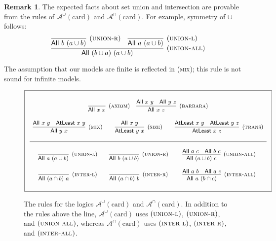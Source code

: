 \documentclass[letterpaper]{article}
\theoremstyle{definition}
\newtheorem{remark}[theorem]{Remark}
\newcommand{\proves}{\vdash}
\newcommand{\Aunion}{\mathscr{A}^{\cup}}
\newcommand{\Sunion}{\mathscr{S}^{\cup}}
\newcommand{\Ainter}{\mathscr{A}^{\cap}}
\newcommand{\proverule}{\textsc}
\newcommand{\axiom}{\proverule{axiom}}
\newcommand{\barbara}{\proverule{barbara}}
\newcommand{\unionl}{\proverule{union-l}}
\newcommand{\unionr}{\proverule{union-r}}
\newcommand{\unionall}{\proverule{union-all}}
\newcommand{\interl}{\proverule{inter-l}}
\newcommand{\interr}{\proverule{inter-r}}
\newcommand{\interall}{\proverule{inter-all}}
\newcommand{\mix}{\proverule{mix}}
\newcommand{\size}{\proverule{size}}
\newcommand{\trans}{\proverule{trans}}
\newcommand{\All}[2]{\mathsf{All}\,\,#1\,\,#2}
\newcommand{\Atleast}[2]{\mathsf{AtLeast}\,\,#1\,\,#2}
\newcommand{\card}{\mathrm{card}}
\begin{document}
\begin{remark}
The expected facts about set union and intersection are provable from the rules of $\Aunion(\card)$ and $\Ainter(\card)$.  For example, symmetry of $\cup$ follows:
$$
\infer[(\unionall)]{\All{(b\cup a)}{(a\cup b)}}{
\infer[(\unionr)]{\All{b}{(a\cup b)}}{} & 
\infer[(\unionl)]{\All{a}{(a\cup b)}}{}}
$$

The assumption that our models are finite is reflected in (\mix); this rule is not sound for infinite models.
\end{remark}


\begin{figure*}[t!]
\begin{equation*}
\boxed{
\small
\begin{array}{c}
\begin{array}{ccc}
\\ 
\infer[(\axiom)]
    {\All{x}{x}}
    {} &
\infer[(\barbara)]
    {\All{x}{z}}
    {\All{x}{y} & \All{y}{z}}
\end{array}
\\ \\ 
\begin{array}{ccc}
\infer[(\mix)]
    {\All{y}{x}}
    {\All{x}{y} & \Atleast{x}{y}} &
\infer[(\size)]
    {\Atleast{y}{x}}
    {\All{x}{y}} &

\infer[(\trans)]
    {\Atleast{x}{z}}
    {\Atleast{x}{y} & \Atleast{y}{z}} \\ \\
    \hline \\
    
\infer[(\unionl)]
    {\All{a}{(a\cup b)}}
    {} &
    \infer[(\unionr)]
    {\All{b}{(a\cup b)}}
    {} &
\infer[(\unionall)]
    {\All{(a\cup b)}{c}}
    {\All{a}{c} & \All{b}{c}} \\ \\

\infer[(\interl)]
    {\All{(a\cap b)}{a}}
    {} &
\infer[(\interr)]
    {\All{(a\cap b)}{b}}
    {} &
\infer[(\interall)]
    {\All{a}{(b\cap c)}}
    {\All{a}{b} & \All{a}{c}} \\ \\
    
\end{array}
\end{array}
}
\end{equation*}
\caption{The rules for the logics $\Aunion(\card)$ and $\Ainter(\card)$.  
In addition to the rules above the line, $\Aunion(\card)$ uses $(\unionl)$, $(\unionr)$, and $(\unionall)$, whereas $\Ainter(\card)$ uses $(\interl)$, $(\interr)$, and $(\interall)$.
\label{fig-rules}}
\end{figure*}
\end{document}
